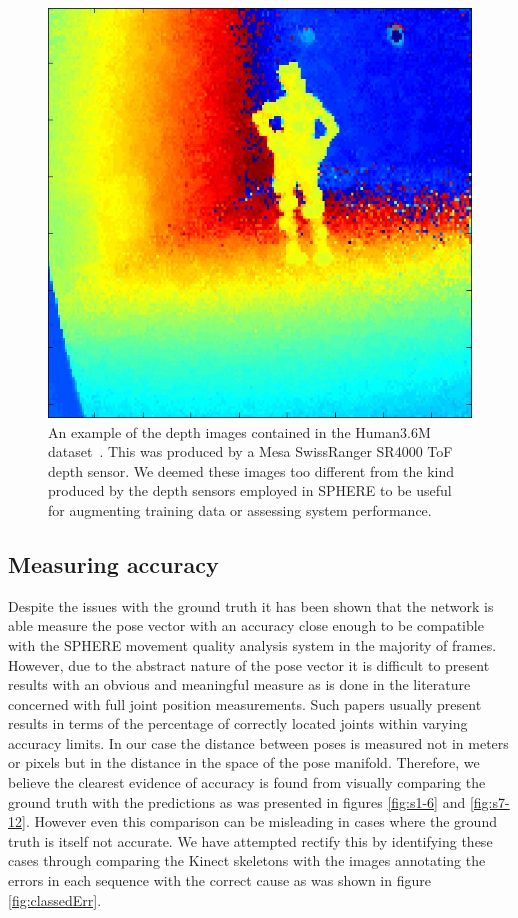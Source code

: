 \documentclass[11pt]{article} %
\begin{document}
\begin{figure}
\centering
\includegraphics*[width=0.33\linewidth,trim={0cm 0cm 0cm 0cm},clip]{hm36}
\caption{An example of the depth images contained in the Human3.6M dataset~\cite{Ionescu2014}. This was produced by a Mesa SwissRanger SR4000 ToF depth sensor. We deemed these images too different from the kind produced by the depth sensors employed in SPHERE to be useful for augmenting training data or assessing system performance. }
\label{fig:human36}
\end{figure}



\subsection{Measuring accuracy}
Despite the issues with the ground truth it has been shown that the network is able measure the pose vector with an accuracy close enough to be compatible with the SPHERE movement quality analysis system in the majority of frames. However, due to the abstract nature of the pose vector it is difficult to present results with an obvious and meaningful measure as is done in the literature concerned with full joint position measurements. Such papers usually present results in terms of the percentage of correctly located joints within varying accuracy limits. In our case the distance between poses is measured not in meters or pixels but in the distance in the space of the pose manifold. Therefore, we believe the clearest evidence of accuracy is found from visually comparing the ground truth with the predictions as was presented in figures \ref{fig:s1-6} and \ref{fig:s7-12}. However even this comparison can be misleading in cases where the ground truth is itself not accurate. We have attempted rectify this by identifying these cases through comparing the Kinect skeletons with the images annotating the errors in each sequence with the correct cause as was shown in figure \ref{fig:classedErr}.
\end{document}
